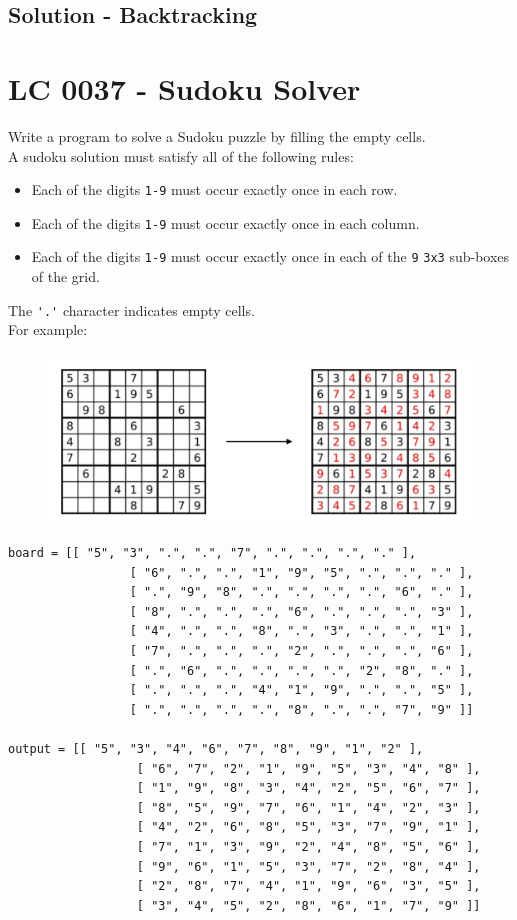 \subsection*{Solution - Backtracking}

\section{LC 0037 - Sudoku Solver}
Write a program to solve a Sudoku puzzle by filling the empty cells.\\

A sudoku solution must satisfy all of the following rules:
\begin{itemize}
	\item Each of the digits {\colorbox{CodeBackground}{\lstinline|1-9|}} must occur exactly once in each row.
	\item Each of the digits {\colorbox{CodeBackground}{\lstinline|1-9|}} must occur exactly once in each column.
	\item Each of the digits {\colorbox{CodeBackground}{\lstinline|1-9|}} must occur exactly once in each of the {\colorbox{CodeBackground}{\lstinline|9|}} {\colorbox{CodeBackground}{\lstinline|3x3|}} sub-boxes of the grid.
\end{itemize}

The {\colorbox{CodeBackground}{\lstinline|'.'|}} character indicates empty cells.\\

For example:
\begin{figure}[H]
	\centering
	\includegraphics[width=0.7\linewidth]{images/lc0037_example}
	\label{fig:lc0037example}
\end{figure}
\begin{lstlisting}
board = [[ "5", "3", ".", ".", "7", ".", ".", ".", "." ], 
				 [ "6", ".", ".", "1", "9", "5", ".", ".", "." ],
				 [ ".", "9", "8", ".", ".", ".", ".", "6", "." ], 
				 [ "8", ".", ".", ".", "6", ".", ".", ".", "3" ],
				 [ "4", ".", ".", "8", ".", "3", ".", ".", "1" ], 
				 [ "7", ".", ".", ".", "2", ".", ".", ".", "6" ],
				 [ ".", "6", ".", ".", ".", ".", "2", "8", "." ], 
				 [ ".", ".", ".", "4", "1", "9", ".", ".", "5" ],
				 [ ".", ".", ".", ".", "8", ".", ".", "7", "9" ]]
				
output = [[ "5", "3", "4", "6", "7", "8", "9", "1", "2" ],
				  [ "6", "7", "2", "1", "9", "5", "3", "4", "8" ],
				  [ "1", "9", "8", "3", "4", "2", "5", "6", "7" ],
				  [ "8", "5", "9", "7", "6", "1", "4", "2", "3" ],
				  [ "4", "2", "6", "8", "5", "3", "7", "9", "1" ],
				  [ "7", "1", "3", "9", "2", "4", "8", "5", "6" ],
				  [ "9", "6", "1", "5", "3", "7", "2", "8", "4" ],
				  [ "2", "8", "7", "4", "1", "9", "6", "3", "5" ],
				  [ "3", "4", "5", "2", "8", "6", "1", "7", "9" ]]
\end{lstlisting}